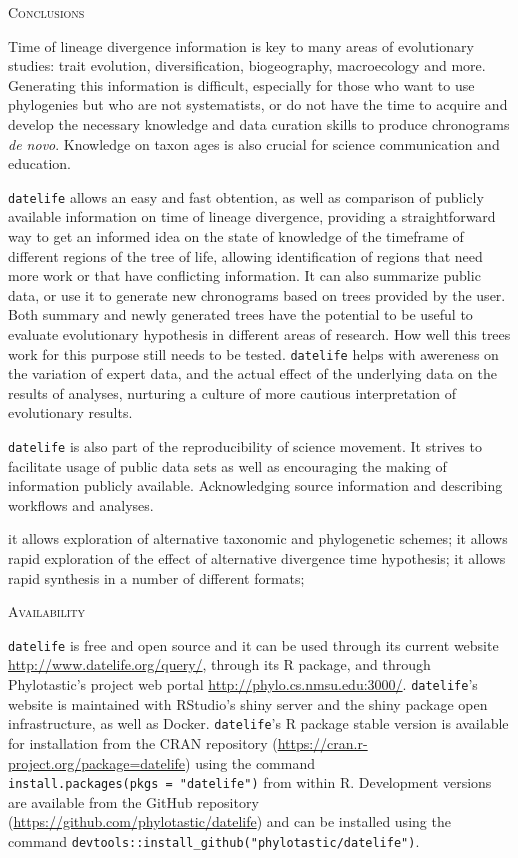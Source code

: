 \documentclass[]{article}
\begin{document}
\begin{center}
\textsc{Conclusions}
\end{center}

Time of lineage divergence information is key to many areas of evolutionary studies: trait evolution,
diversification, biogeography, macroecology and more. Generating this information is difficult,
especially for those who want to use phylogenies but who are not systematists, or
do not have the time to acquire and develop the necessary knowledge and data curation skills
to produce chronograms \emph{de novo}. Knowledge on taxon ages is also crucial for
science communication and education.

\texttt{datelife} allows an easy and fast obtention, as well as comparison of publicly available information
on time of lineage divergence, providing a straightforward way to get an informed idea on the state of knowledge of the timeframe of different regions of the tree of life, allowing identification of regions that need more work or that have conflicting information.
It can also summarize public data, or use it to generate new chronograms based on trees provided by the user.
Both summary and newly generated trees have the potential to be useful to evaluate evolutionary hypothesis in different areas of research. How well this trees work for this purpose still needs to be tested. \texttt{datelife} helps with awereness on the variation of expert data, and the actual effect of the underlying data on the results of analyses, nurturing a culture of more cautious interpretation of evolutionary results.

\texttt{datelife} is also part of the reproducibility of science movement. It strives to facilitate usage of public data sets as well as encouraging the making of information publicly available. Acknowledging source information and describing workflows and analyses.

it allows exploration of alternative taxonomic and phylogenetic schemes;
it allows rapid exploration of the effect of alternative divergence time hypothesis;
it allows rapid synthesis in a number of different formats;

\begin{center}
\textsc{Availability}
\end{center}

\texttt{datelife} is free and open source and it can be used through its current website
\url{http://www.datelife.org/query/}, through its R package, and through Phylotastic's project web portal \url{http://phylo.cs.nmsu.edu:3000/}.
\texttt{datelife}'s website is maintained with RStudio's shiny server and the shiny package open infrastructure, as well as Docker.
\texttt{datelife}'s R package stable version is available
for installation from the CRAN repository (\url{https://cran.r-project.org/package=datelife})
using the command \texttt{install.packages(pkgs\ =\ "datelife")} from within R. Development versions
are available from the GitHub repository (\url{https://github.com/phylotastic/datelife})
and can be installed using the command \texttt{devtools::install\_github("phylotastic/datelife")}.
\end{document}
